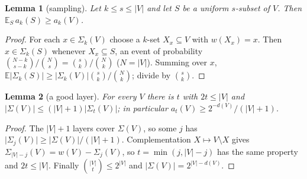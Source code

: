 \documentclass[11pt]{article}
\newtheorem{lemma}{Lemma}[section]
\theoremstyle{definition}
\newcommand{\E}{\mathbb E}
\newcommand{\abs}[1]{\lvert #1\rvert}
\begin{document}
\begin{lemma}[sampling]\label{lem:sample}
Let $k\le s\le\abs V$ and let $S$ be a uniform $s$-subset of $V$. Then $\E_S\,a_k(S)\ge a_k(V)$.
\end{lemma}
\begin{proof}
For each $x\in\Sigma_k(V)$ choose a $k$-set $X_x\subseteq V$ with $w(X_x)=x$. Then $x\in\Sigma_k(S)$ whenever
$X_x\subseteq S$, an event of probability $\binom{N-k}{s-k}/\binom Ns=\binom sk/\binom Nk$ ($N=\abs V$). Summing over
$x$, $\E\abs{\Sigma_k(S)}\ge\abs{\Sigma_k(V)}\binom sk/\binom Nk$; divide by $\binom sk$.
\end{proof}

\begin{lemma}[a good layer]\label{lem:good}
For every $V$ there is $t$ with $2t\le\abs V$ and $\abs{\Sigma(V)}\le(\abs V+1)\abs{\Sigma_t(V)}$; in particular
$a_t(V)\ge2^{-d(V)}/(\abs V+1)$.
\end{lemma}
\begin{proof}
The $\abs V+1$ layers cover $\Sigma(V)$, so some $j$ has $\abs{\Sigma_j(V)}\ge\abs{\Sigma(V)}/(\abs V+1)$.
Complementation $X\mapsto V\setminus X$ gives $\Sigma_{\abs V-j}(V)=w(V)-\Sigma_j(V)$, so $t=\min(j,\abs V-j)$ has the
same property and $2t\le\abs V$. Finally $\binom{\abs V}{t}\le2^{\abs V}$ and $\abs{\Sigma(V)}=2^{\abs V-d(V)}$.
\end{proof}
\end{document}

